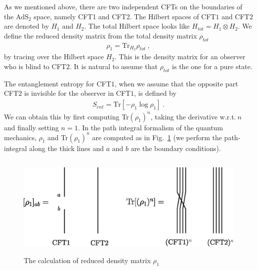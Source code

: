 \documentclass[12pt]{article}
\begin{document}
As we mentioned above, there are two independent CFTs on the boundaries
of the AdS$_2$ space, namely CFT1 and CFT2.
The Hilbert spaces of CFT$1$ and CFT$2$ are denoted by $H_1$ and
$H_2$. The total Hilbert space looks like $H_{tot}=H_1\otimes H_2$.
We define the reduced density matrix from the total density matrix
$\rho_{tot}$
\begin{align}
 \rho_1=\mbox{Tr}_{H_2}\rho_{tot} \ ,
\end{align}
by tracing over the Hilbert space $H_2$.
This is the density matrix for an observer who is blind to CFT$2$.
It is natural to assume that $\rho_{tot}$ is the one for a pure state.

The entanglement entropy for CFT$1$, when we assume that the
opposite part CFT$2$ is invisible for the observer in CFT$1$, is
defined by
\begin{align}
 S_{ent}=\mbox{Tr} [-\rho_1 \log \rho_1] \ .
\end{align}
We can obtain this by first computing Tr$(\rho_1)^n$, taking the
derivative w.r.t.$~n$ and finally setting $n=1$. In the path
integral formalism of the quantum mechanics, $\rho_1$ and
Tr$(\rho_1)^n$ are computed as in Fig.\ \ref{qft} (we perform the
path-integral along the thick lines and $a$ and $b$ are the
boundary conditions).
\begin{figure}[t]
\begin{center}
  \hspace*{0.5cm}
  \includegraphics[height=5cm]{DenMat.eps}
  \caption{The calculation of reduced density matrix $\rho_1$}\label{qft}
\end{center}
\end{figure}
\end{document}
